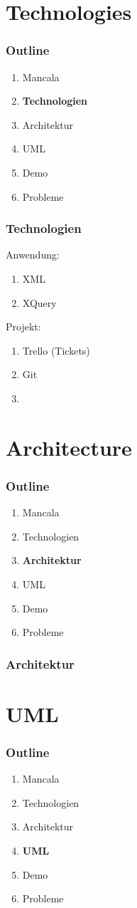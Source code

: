 \documentclass[
	10pt,
	t		%
]{beamer}
\begin{document}
\section{Technologies}
\begin{frame}
\frametitle{Outline}
\begin{enumerate}
\item Mancala
\item \textbf{Technologien}
\item Architektur
\item UML
\item Demo
\item Probleme
\end{enumerate}
\end{frame}

\begin{frame}
\frametitle{Technologien}
Anwendung:
\begin{enumerate}
	\item XML
	\item XQuery
\end{enumerate}
Projekt:
\begin{enumerate}
	\item Trello (Tickets)
	\item Git
	\item 
\end{enumerate}
\end{frame}

\section{Architecture}
\begin{frame}
\frametitle{Outline}
\begin{enumerate}
\item Mancala
\item Technologien
\item \textbf{Architektur}
\item UML
\item Demo
\item Probleme
\end{enumerate}
\end{frame}

\begin{frame}
\frametitle{Architektur}

\end{frame}

\section{UML}
\begin{frame}
\frametitle{Outline}
\begin{enumerate}
\item Mancala
\item Technologien
\item Architektur
\item \textbf{UML}
\item Demo
\item Probleme
\end{enumerate}
\end{frame}
\end{document}
